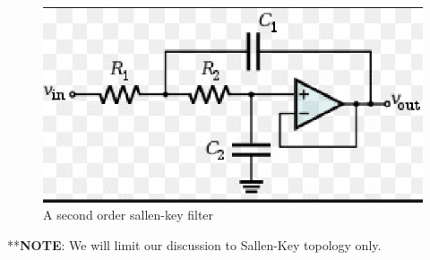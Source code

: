 \documentclass[journal,12pt,twocolumn]{IEEEtran}
\renewcommand\thesection{\arabic{section}}
\begin{document}
\begin{enumerate}[label=\thesection.\arabic*,ref=\thesection.\theenumi]
 \begin{figure}[!ht]
\centering
\includegraphics[width=\columnwidth]{./figs/sallenkey.eps}
\caption{A second order sallen-key filter}
\label{fig:2}
\end{figure}
**\textbf{NOTE}: We will limit our discussion to Sallen-Key topology only.
\end{enumerate}
\end{document}
